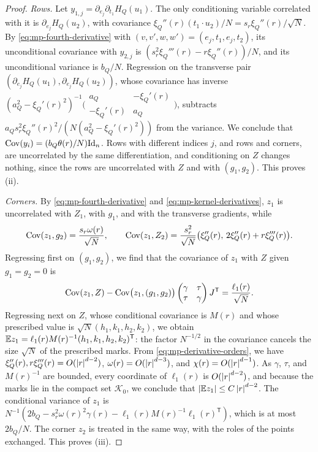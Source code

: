 \begin{proof}
\emph{Rows.} Let $y_{1,j}=\partial_{e_j}\partial_{t_1}H_Q(u_1)$. The only conditioning variable correlated with it is $\partial_{e_j}H_Q(u_2)$, with covariance $\xi_Q''(r)(t_1\cdot u_2)/N=s_r\xi_Q''(r)/\sqrt N$. By \eqref{eq:mp-fourth-derivative} with $(v,v',w,w')=(e_j,t_1,e_j,t_2)$, its unconditional covariance with $y_{2,j}$ is $(s_r^2\xi_Q'''(r)-r\xi_Q''(r))/N$, and its unconditional variance is $b_Q/N$. Regression on the transverse pair $(\partial_{e_j}H_Q(u_1),\partial_{e_j}H_Q(u_2))$, whose covariance has inverse $(a_Q^2-\xi_Q'(r)^2)^{-1}\bigl(\begin{smallmatrix}a_Q&-\xi_Q'(r)\\-\xi_Q'(r)&a_Q\end{smallmatrix}\bigr)$, subtracts $a_Qs_r^2\xi_Q''(r)^2/(N(a_Q^2-\xi_Q'(r)^2))$ from the variance. We conclude that $\operatorname{Cov}(y_i)=(b_Q\theta(r)/N)\mathrm{Id}_n$. Rows with different indices $j$, and rows and corners, are uncorrelated by the same differentiation, and conditioning on $Z$ changes nothing, since the rows are uncorrelated with $Z$ and with $(g_1,g_2)$. This proves (ii).

\emph{Corners.} By \eqref{eq:mp-fourth-derivative} and \eqref{eq:mp-kernel-derivatives}, $z_1$ is uncorrelated with $Z_1$, with $g_1$, and with the transverse gradients, while
\[
\operatorname{Cov}(z_1,g_2)=\frac{s_r\omega(r)}{\sqrt N},\qquad \operatorname{Cov}(z_1,Z_2)=\frac{s_r^2}{\sqrt N}\bigl(\xi_Q''(r),\,2\xi_Q''(r)+r\xi_Q'''(r)\bigr).
\]
Regressing first on $(g_1,g_2)$, we find that the covariance of $z_1$ with $Z$ given $g_1=g_2=0$ is
\[
\operatorname{Cov}(z_1,Z)-\operatorname{Cov}\bigl(z_1,(g_1,g_2)\bigr)\begin{pmatrix}\gamma&\tau\\\tau&\gamma\end{pmatrix}J^{\mathsf T}=\frac{\ell_1(r)}{\sqrt N}.
\]
Regressing next on $Z$, whose conditional covariance is $M(r)$ and whose prescribed value is $\sqrt N(h_1,k_1,h_2,k_2)$, we obtain $\mathbb E z_1=\ell_1(r)M(r)^{-1}(h_1,k_1,h_2,k_2)^{\mathsf T}$: the factor $N^{-1/2}$ in the covariance cancels the size $\sqrt N$ of the prescribed marks. From \eqref{eq:mp-derivative-orders}, we have $\xi_Q''(r),r\xi_Q'''(r)=O(\left|r\right|^{d-2})$, $\omega(r)=O(\left|r\right|^{d-3})$, and $\chi(r)=O(\left|r\right|^{d-1})$. As $\gamma$, $\tau$, and $M(r)^{-1}$ are bounded, every coordinate of $\ell_1(r)$ is $O(\left|r\right|^{d-2})$, and because the marks lie in the compact set $\mathcal K_0$, we conclude that $\left|\mathbb E z_1\right|\le C\left|r\right|^{d-2}$. The conditional variance of $z_1$ is $N^{-1}(2b_Q-s_r^2\omega(r)^2\gamma(r)-\ell_1(r)M(r)^{-1}\ell_1(r)^{\mathsf T})$, which is at most $2b_Q/N$. The corner $z_2$ is treated in the same way, with the roles of the points exchanged. This proves (iii).
\end{proof}

